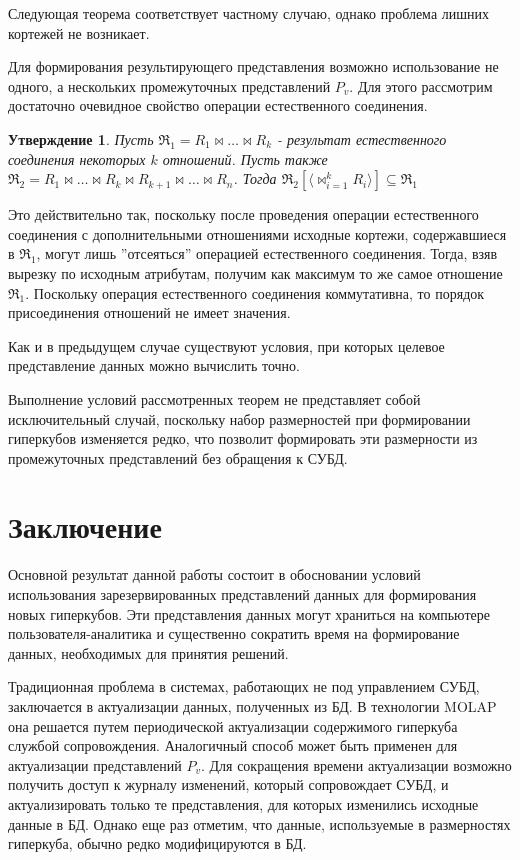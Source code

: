 \documentclass[10pt,a4paper]{article}
\newtheorem{statement}{Утверждение}
\begin{document}
Следующая теорема соответствует частному случаю, однако проблема лишних кортежей не возникает.



Для формирования результирующего представления возможно использование
не одного, а нескольких промежуточных представлений $P_v$. Для этого
рассмотрим достаточно очевидное свойство операции естественного соединения.

\begin{statement}
Пусть $\Re_1 = R_1 \Join \dots \Join R_k$ - результат естественного
соединения некоторых $k$ отношений. Пусть также $\Re_2 = R_1 \Join \dots
\Join R_k \Join R_{k+1} \Join \dots \Join R_{n}$. 
Тогда $\Re_2 [\langle \Join_{i=1}^{k} R_i \rangle] \subseteq \Re_1$
\label{join_property}
\end{statement}

Это действительно так, поскольку после проведения операции естественного соединения
с дополнительными отношениями исходные кортежи, содержавшиеся в $\Re_1$, могут
лишь ''отсеяться'' операцией естественного соединения. Тогда, взяв вырезку по
исходным атрибутам, получим как максимум то же самое отношение $\Re_1$. Поскольку
операция естественного соединения коммутативна, то порядок присоединения отношений
не имеет значения.



Как и в предыдущем случае существуют условия, при которых целевое представление
данных можно вычислить точно.



Выполнение условий рассмотренных теорем не представляет собой  исключительный случай,
поскольку набор размерностей при формировании гиперкубов изменяется редко, что позволит
формировать эти размерности из промежуточных представлений без обращения к СУБД.

\section{Заключение}

Основной результат данной работы состоит в обосновании условий использования
зарезервированных представлений данных для формирования новых гиперкубов.
Эти представления данных могут храниться на компьютере пользователя-аналитика
и существенно сократить время на формирование данных, необходимых для принятия решений.

Традиционная проблема в системах, работающих не под управлением СУБД, заключается
в актуализации данных, полученных из БД. В технологии MOLAP она решается путем периодической
актуализации содержимого гиперкуба службой сопровождения. Аналогичный способ может быть
применен для актуализации представлений $P_v$. Для сокращения времени актуализации возможно
получить доступ к журналу изменений, который сопровождает СУБД, и актуализировать только те
представления, для которых изменились исходные данные в БД. Однако еще раз отметим, что данные,
используемые в размерностях гиперкуба, обычно редко модифицируются в БД.
\end{document}
